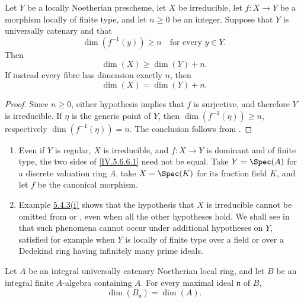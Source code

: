 \begin{corollary}[5.6.8]
\label{IV.5.6.8}
Let $Y$ be a locally Noetherian prescheme, let $X$ be irreducible,
let $f:X\to Y$ be a morphism locally of finite type, and let
$n\geq0$ be an integer.  Suppose that $Y$ is universally catenary
and that
\[
\dim(f^{-1}(y))\geq n
\quad\text{for every }y\in Y.
\]
Then
\begin{equation}
\dim(X)\geq\dim(Y)+n.
\tag{5.6.8.1}\label{IV.5.6.8.1}
\end{equation}
If instead every fibre has dimension exactly $n$, then
\begin{equation}
\dim(X)=\dim(Y)+n.
\tag{5.6.8.2}\label{IV.5.6.8.2}
\end{equation}
\end{corollary}

\begin{proof}
Since $n\geq0$, either hypothesis implies that $f$ is surjective,
and therefore $Y$ is irreducible.  If $\eta$ is the generic point of
$Y$, then $\dim(f^{-1}(\eta))\geq n$, respectively
$\dim(f^{-1}(\eta))=n$.  The conclusion follows from
.
\end{proof}

\begin{remarks}[5.6.9]
\label{IV.5.6.9}
\begin{enumerate}[{\rm(i)}]
\item
{}
\label{IV.5.6.9.i}
Even if $Y$ is regular, $X$ is irreducible, and $f:X\to Y$ is
dominant and of finite type, the two sides of
\eqref{IV.5.6.6.1} need not be equal.  Take
$Y=\Spec(A)$ for a discrete valuation ring $A$, take
$X=\Spec(K)$ for its fraction field $K$, and let $f$ be the
canonical morphism.

\item
{}
\label{IV.5.6.9.ii}
Example {\hyperref[IV.5.4.3.i]{5.4.3\textup{(i)}}} shows that the
hypothesis that $X$ is
irreducible cannot be omitted from  or
, even when all the other hypotheses hold.  We shall
see in  that such phenomena cannot occur under
additional hypotheses on $Y$, satisfied for example when $Y$ is
locally of finite type over a field or over a Dedekind ring having
infinitely many prime ideals.
\end{enumerate}
\end{remarks}

\begin{proposition}[5.6.10]
\label{IV.5.6.10}
Let $A$ be an integral universally catenary Noetherian local ring,
and let $B$ be an integral finite $A$-algebra containing $A$.  For
every maximal ideal $\mathfrak n$ of $B$,
\[
\dim(B_{\mathfrak n})=\dim(A).
\]
\end{proposition}

